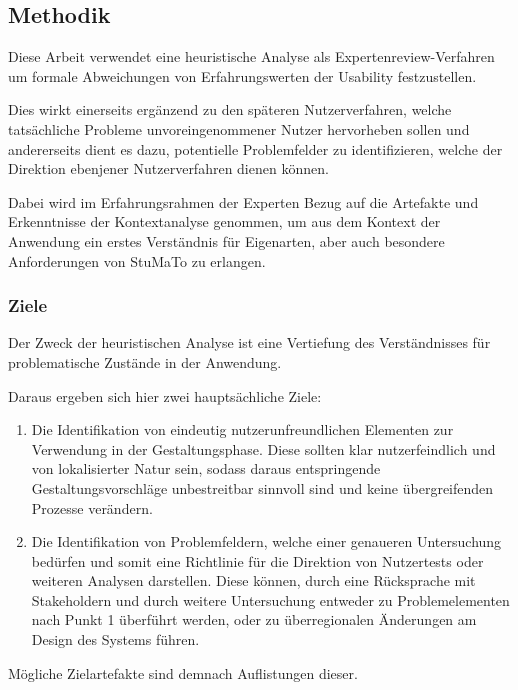 \documentclass[
  12pt,
  ngerman,
  a4paper,
]{article}
\providecommand{\tightlist}{%
  \setlength{\itemsep}{0pt}\setlength{\parskip}{0pt}}
\begin{document}
\hypertarget{methodik}{%
\subsection{Methodik}\label{methodik}}

Diese Arbeit verwendet eine heuristische Analyse als
Expertenreview-Verfahren um formale Abweichungen von Erfahrungswerten
der Usability festzustellen.

Dies wirkt einerseits ergänzend zu den späteren Nutzerverfahren, welche
tatsächliche Probleme unvoreingenommener Nutzer hervorheben sollen und
andererseits dient es dazu, potentielle Problemfelder zu identifizieren,
welche der Direktion ebenjener Nutzerverfahren dienen können.

Dabei wird im Erfahrungsrahmen der Experten Bezug auf die Artefakte und
Erkenntnisse der Kontextanalyse genommen, um aus dem Kontext der
Anwendung ein erstes Verständnis für Eigenarten, aber auch besondere
Anforderungen von StuMaTo zu erlangen.

\hypertarget{ziele}{%
\subsubsection{Ziele}\label{ziele}}

Der Zweck der heuristischen Analyse ist eine Vertiefung des
Verständnisses für problematische Zustände in der Anwendung.

Daraus ergeben sich hier zwei hauptsächliche Ziele:

\begin{enumerate}
\def\labelenumi{\arabic{enumi}.}
\tightlist
\item
  Die Identifikation von eindeutig nutzerunfreundlichen Elementen zur
  Verwendung in der Gestaltungsphase. Diese sollten klar nutzerfeindlich
  und von lokalisierter Natur sein, sodass daraus entspringende
  Gestaltungsvorschläge unbestreitbar sinnvoll sind und keine
  übergreifenden Prozesse verändern.
\item
  Die Identifikation von Problemfeldern, welche einer genaueren
  Untersuchung bedürfen und somit eine Richtlinie für die Direktion von
  Nutzertests oder weiteren Analysen darstellen. Diese können, durch
  eine Rücksprache mit Stakeholdern und durch weitere Untersuchung
  entweder zu Problemelementen nach Punkt 1 überführt werden, oder zu
  überregionalen Änderungen am Design des Systems führen.
\end{enumerate}

Mögliche Zielartefakte sind demnach Auflistungen dieser.
\end{document}
